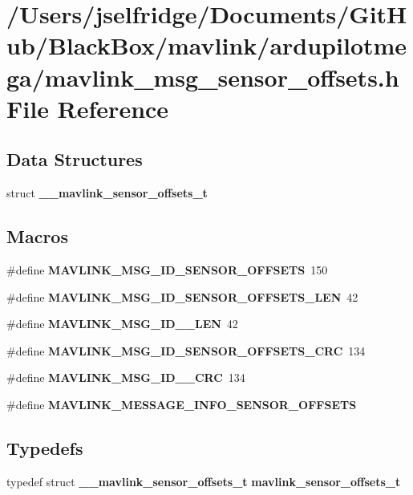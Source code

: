 \section{/\+Users/jselfridge/\+Documents/\+Git\+Hub/\+Black\+Box/mavlink/ardupilotmega/mavlink\+\_\+msg\+\_\+sensor\+\_\+offsets.h File Reference}
\label{mavlink__msg__sensor__offsets_8h}
\subsection*{Data Structures}
\begin{DoxyCompactItemize}
\item 
struct \textbf{ \+\_\+\+\_\+mavlink\+\_\+sensor\+\_\+offsets\+\_\+t}
\end{DoxyCompactItemize}
\subsection*{Macros}
\begin{DoxyCompactItemize}
\item 
\#define \textbf{ M\+A\+V\+L\+I\+N\+K\+\_\+\+M\+S\+G\+\_\+\+I\+D\+\_\+\+S\+E\+N\+S\+O\+R\+\_\+\+O\+F\+F\+S\+E\+TS}~150
\item 
\#define \textbf{ M\+A\+V\+L\+I\+N\+K\+\_\+\+M\+S\+G\+\_\+\+I\+D\+\_\+\+S\+E\+N\+S\+O\+R\+\_\+\+O\+F\+F\+S\+E\+T\+S\+\_\+\+L\+EN}~42
\item 
\#define \textbf{ M\+A\+V\+L\+I\+N\+K\+\_\+\+M\+S\+G\+\_\+\+I\+D\+\_\+\_\+\+L\+EN}~42
\item 
\#define \textbf{ M\+A\+V\+L\+I\+N\+K\+\_\+\+M\+S\+G\+\_\+\+I\+D\+\_\+\+S\+E\+N\+S\+O\+R\+\_\+\+O\+F\+F\+S\+E\+T\+S\+\_\+\+C\+RC}~134
\item 
\#define \textbf{ M\+A\+V\+L\+I\+N\+K\+\_\+\+M\+S\+G\+\_\+\+I\+D\+\_\+\_\+\+C\+RC}~134
\item 
\#define \textbf{ M\+A\+V\+L\+I\+N\+K\+\_\+\+M\+E\+S\+S\+A\+G\+E\+\_\+\+I\+N\+F\+O\+\_\+\+S\+E\+N\+S\+O\+R\+\_\+\+O\+F\+F\+S\+E\+TS}
\end{DoxyCompactItemize}
\subsection*{Typedefs}
\begin{DoxyCompactItemize}
\item 
typedef struct \textbf{ \+\_\+\+\_\+mavlink\+\_\+sensor\+\_\+offsets\+\_\+t} \textbf{ mavlink\+\_\+sensor\+\_\+offsets\+\_\+t}
\end{DoxyCompactItemize}


